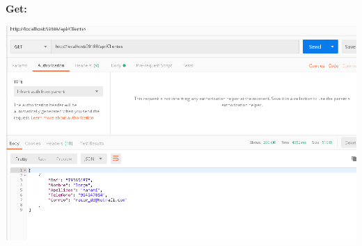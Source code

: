 \begin{flushleft}
\textbf{}\\
\textbf{}\\
\textbf{}\\
\textbf{}\\
\textbf{}\\
\textbf{}\\
\textbf{}\\
\textbf{}\\
\textbf{}\\
\textbf{}\\
\textbf{}\\
\textbf{}\\
\textbf{}\\
\textbf{}\\
\textbf{Get:}\\
\begin{center}
	\includegraphics[width=19cm]{./Imagenes/get1} 
	\end{center}
\textbf{}\\
\textbf{}\\
\textbf{}\\
\textbf{}\\
\textbf{}\\
\textbf{}\\
\textbf{}\\
\textbf{}\\
\textbf{}\\
\textbf{}\\
\textbf{}\\
\textbf{}\\
\textbf{}\\
\textbf{}\\
\textbf{}\\
\textbf{}\\
\textbf{}\\

\end{flushleft}
